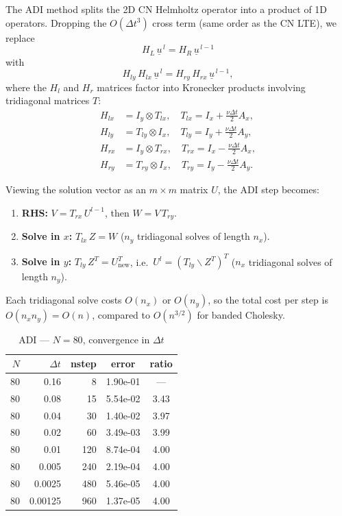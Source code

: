 \documentclass[11pt]{article}
\begin{document}
The ADI method splits the 2D CN Helmholtz operator into a product of
1D operators. Dropping the $O(\Delta t^3)$ cross term (same order as
the CN LTE), we replace
\[
  H_L\,\underline{u}^{\,l} = H_R\,\underline{u}^{\,l-1}
\]
with
\[
  H_{ly}\,H_{lx}\,\underline{u}^{\,l}
  = H_{ry}\,H_{rx}\,\underline{u}^{\,l-1},
\]
where the $H_l$ and $H_r$ matrices factor into Kronecker products involving
tridiagonal matrices $T$:
\begin{align*}
  H_{lx} &= I_y \otimes T_{lx}, \quad T_{lx} = I_x + \tfrac{\nu\Delta t}{2}A_x, \\
  H_{ly} &= T_{ly} \otimes I_x, \quad T_{ly} = I_y + \tfrac{\nu\Delta t}{2}A_y, \\
  H_{rx} &= I_y \otimes T_{rx}, \quad T_{rx} = I_x - \tfrac{\nu\Delta t}{2}A_x, \\
  H_{ry} &= T_{ry} \otimes I_x, \quad T_{ry} = I_y - \tfrac{\nu\Delta t}{2}A_y.
\end{align*}

Viewing the solution vector as an $m \times m$ matrix $U$, the ADI step becomes:
\begin{enumerate}[nosep]
  \item \textbf{RHS:} $V = T_{rx}\,U^{l-1}$, then $W = V\,T_{ry}$.
  \item \textbf{Solve in $x$:} $T_{lx}\,Z = W$
        \quad($n_y$ tridiagonal solves of length $n_x$).
  \item \textbf{Solve in $y$:} $T_{ly}\,Z^T = U_{\mathrm{new}}^T$,
        i.e.\ $U^l = (T_{ly} \backslash Z^T)^T$
        \quad($n_x$ tridiagonal solves of length $n_y$).
\end{enumerate}

Each tridiagonal solve costs $O(n_x)$ or $O(n_y)$, so the total cost per step
is $O(n_x n_y) = O(n)$, compared to $O(n^{3/2})$ for banded Cholesky.

\begin{table}[h!]
\centering
\caption{ADI --- $N=80$, convergence in $\Delta t$}
\begin{tabular}{rrrcc}
\toprule
$N$ & $\Delta t$ & nstep & error & ratio \\
\midrule
80 & 0.16   &    8 & 1.90e-01 & --- \\
80 & 0.08   &   15 & 5.54e-02 & 3.43 \\
80 & 0.04   &   30 & 1.40e-02 & 3.97 \\
80 & 0.02   &   60 & 3.49e-03 & 3.99 \\
80 & 0.01   &  120 & 8.74e-04 & 4.00 \\
80 & 0.005  &  240 & 2.19e-04 & 4.00 \\
80 & 0.0025 &  480 & 5.46e-05 & 4.00 \\
80 & 0.00125&  960 & 1.37e-05 & 4.00 \\
\bottomrule
\end{tabular}
\end{table}
\end{document}
